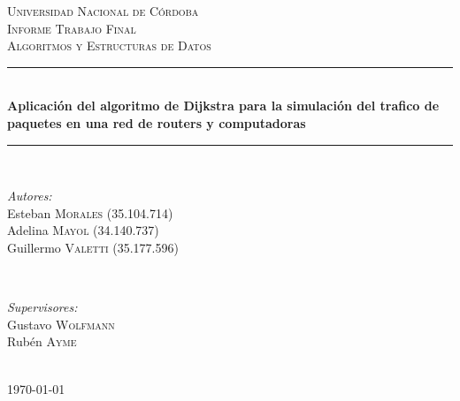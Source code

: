 \documentclass[12pt]{article} %
\begin{document}

\begin{titlepage}

\newcommand{\HRule}{\rule{\linewidth}{0.5mm}} %

\center %

\textsc{\LARGE Universidad Nacional de Córdoba}\\[1.5cm] %
\textsc{\Large Informe Trabajo Final}\\[0.5cm] %
\textsc{\large Algoritmos y Estructuras de Datos}\\[0.5cm] %

\HRule \\[0.4cm]
{ \huge \bfseries Aplicación del algoritmo de Dijkstra para la simulación del trafico de paquetes en una red de routers y computadoras}\\[0.4cm] %
\HRule \\[1.5cm]

\begin{minipage}{0.4\textwidth}
\begin{flushleft} \large
\emph{Autores:}\\
Esteban \textsc{Morales} (35.104.714)\\
Adelina \textsc{Mayol} (34.140.737)\\
Guillermo \textsc{Valetti} (35.177.596)\\
\end{flushleft}
\end{minipage}
~
\begin{minipage}{0.4\textwidth}
\begin{flushright} \large
\emph{Supervisores:} \\
Gustavo \textsc{Wolfmann}\\ %
Rubén \textsc{Ayme}
\end{flushright}
\end{minipage}\\[4cm]

{\large \today}\\[3cm] %


\vfill %
\restoregeometry
\end{titlepage}
\end{document}

